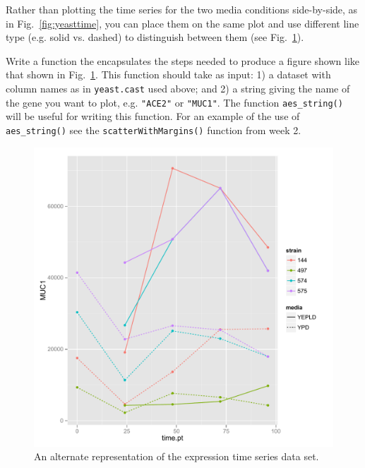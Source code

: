 \begin{assignment}
  Rather than plotting the time series for the two media conditions side-by-side, as in Fig.~\ref{fig:yeasttime}, you can place them on the same plot and use different line type (e.g. solid vs. dashed) to distinguish between them (see Fig.~\ref{fig:yeastalt}). 

\smallskip

  Write a function the encapsulates the steps needed to produce a figure shown like that shown in Fig.~\ref{fig:yeastalt}. This function should take as input: 1) a dataset with column names as in \lstinline|yeast.cast| used above; and 2) a string giving the name of the gene you want to plot, e.g. \lstinline|"ACE2"| or \lstinline|"MUC1"|.  The function \lstinline|aes_string()| will be useful for writing this function.  For an example of the use of \lstinline|aes_string()| see the \lstinline|scatterWithMargins()| function from week 2. 

\end{assignment}
%
\begin{figure}[htbp]
\centering
\includegraphics[width=0.5\columnwidth]{./figures/hands-on3/timeseries-alt.pdf}
\caption{An alternate representation of the expression time series data set.\label{fig:yeastalt}}
\end{figure}


    
